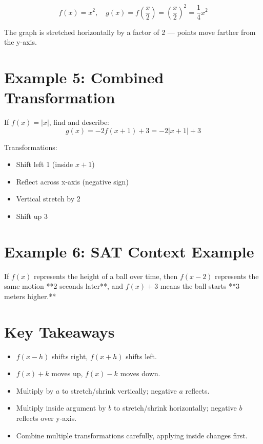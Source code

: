 \documentclass[14pt]{extarticle}
\begin{document}
\[
f(x) = x^2, \quad g(x) = f\left(\frac{x}{2}\right) = \left(\frac{x}{2}\right)^2 = \frac{1}{4}x^2
\]

The graph is stretched horizontally by a factor of 2 — points move farther from the y-axis.

\section*{Example 5: Combined Transformation}

If \(f(x) = |x|\), find and describe:
\[
g(x) = -2f(x + 1) + 3 = -2|x + 1| + 3
\]

Transformations:
\begin{itemize}
  \item Shift left 1 (inside \(x + 1\))
  \item Reflect across x-axis (negative sign)
  \item Vertical stretch by 2
  \item Shift up 3
\end{itemize}

\section*{Example 6: SAT Context Example}

If \(f(x)\) represents the height of a ball over time,  
then \(f(x - 2)\) represents the same motion **2 seconds later**,  
and \(f(x) + 3\) means the ball starts **3 meters higher.**

\section*{Key Takeaways}
\begin{itemize}
  \item \(f(x - h)\) shifts right, \(f(x + h)\) shifts left.
  \item \(f(x) + k\) moves up, \(f(x) - k\) moves down.
  \item Multiply by \(a\) to stretch/shrink vertically; negative \(a\) reflects.
  \item Multiply inside argument by \(b\) to stretch/shrink horizontally; negative \(b\) reflects over y-axis.
  \item Combine multiple transformations carefully, applying inside changes first.
\end{itemize}

\newpage

\end{document}

